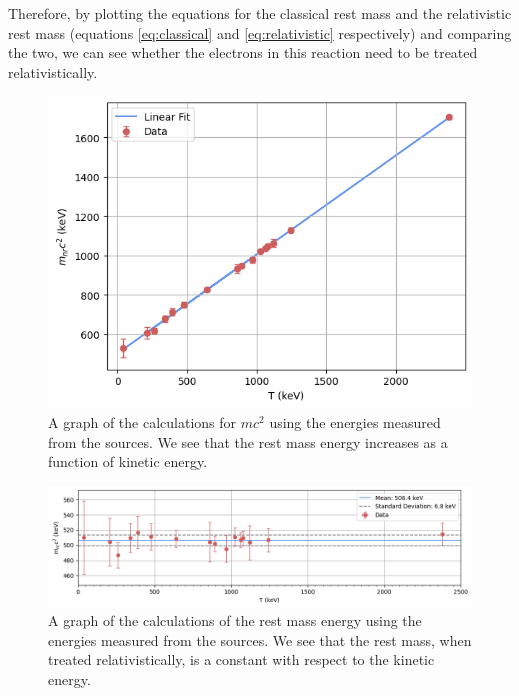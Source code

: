 \documentclass[%
reprint,
amsmath,amssymb,
aps,
floatfix
]{revtex4-2}
\begin{document}
		Therefore, by plotting the equations for the classical rest mass and the relativistic rest mass (equations \ref{eq:classical} and \ref{eq:relativistic} respectively) and comparing the two, we can see whether the electrons in this reaction need to be treated relativistically.		
		
		
			\begin{figure}
				\includegraphics[width=0.85\columnwidth]{classicalRestMass.png}
				\caption{\label{fig:classicalRestMass}A graph of the calculations for $mc^2$ using the energies measured from the sources. We see that the rest mass energy increases as a function of kinetic energy.}
			\end{figure}

			\begin{figure}
				\includegraphics[width=1.7\columnwidth]{relativisticRestMass.png}
				\caption{\label{fig:relativisticRestMass}A graph of the calculations of the rest mass energy using the energies measured from the sources. We see that the rest mass, when treated relativistically, is a constant with respect to the kinetic energy.}
			\end{figure}		
		
\end{document}
